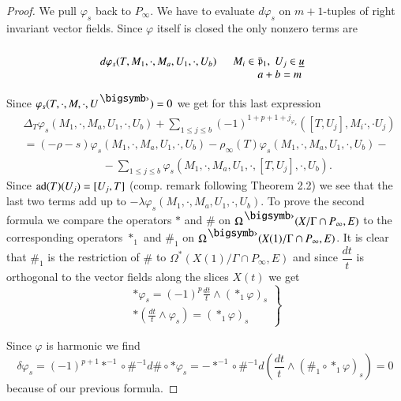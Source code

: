 \begin{proof}
We pull $\varphi_s$ back to $P_\infty$. We have to evaluate $d \varphi_s$ on $m+1$-tuples of right invariant vector fields. Since $\varphi$ itself is closed the only nonzero terms are
$$
d \varphi_s (T, M_1, \cdot , M_a, U_1, \cdot , U_b )  \quad 
\begin{array}{c}
\\
M_i \in \bar{\mathfrak{p}}_1, \; U_j \in \underline{u}\\
\qquad a + b = m
\end{array}
$$

Since $\varphi_s (T, \cdot , M, \cdot, U^\bigdot) =0$ we get for this last expression
\begin{align*}
& \Delta_{T} \varphi_s (M_1, \cdot , M_a, U_1, \cdot , U_b) + \sum\limits_{1 \leqslant j \leqslant b} (-1)^{1+ p + 1 + j_{\varphi_s}} ([T, U_j], M_i \cdot , \cdot U_j)\\
& = (-\rho -s) \varphi_s (M_1, \cdot, M_a, U_1, \cdot , U_b) - \rho_\infty (T)\varphi_s (M_1, \cdot, M_a, U_1, \cdot , U_b) - \\
& \hspace{3cm} - \sum\limits_{1 \leqslant j \leqslant b} \varphi_s (M_1, \cdot, M_a, U_1, \cdot , [T, U_j], \cdot , U_b).
\end{align*}
Since $\operatorname{ad} (T) (U_j) = [U_j, T]$ (comp. remark following Theorem 2.2) we see that the last two terms add up to $- \lambda \varphi_s (M_1, \cdot, M_a, U_1, \cdot , U_b)$. To prove the second formula we compare the operators $\ast$ and $\#$ on $\Omega^\bigdot (X/ \Gamma \cap P_\infty, E)$ to the corresponding operators $\ast_1$ and $\#_1$ on $\Omega^\bigdot (X(1)/ \Gamma \cap P_\infty, E)$. It is clear that $\#_1$ is the restriction of $\#$ to $\Omega^\ast (X(1)/\Gamma \cap P_\infty, E)$ and since $\dfrac{dt}{t}$ is orthogonal to the vector fields along the slices $X(t)$ we get
\begin{equation}
\left. 
\begin{aligned}
\ast \varphi_s = (-1)^p \frac{dt}{t} \wedge (\ast_1 \varphi)_s \\
\ast \left(\frac{dt}{t}\wedge\varphi_s \right) =(\ast_1 \varphi)_s
\end{aligned}
\right\}
\label{art5-eq3.2}
\end{equation}

Since $\varphi$ is harmonic we find
$$
\delta \varphi_s = (-1)^{p+1} \ast^{-1} \circ \#^{-1} d \# \circ \ast \varphi_s = -\ast^{-1} \circ \#^{-1} d \left(\frac{dt}{t} \wedge (\#_1 \circ \ast_1 \varphi)_s \right) = 0
$$
because of our previous formula.


\end{proof}
